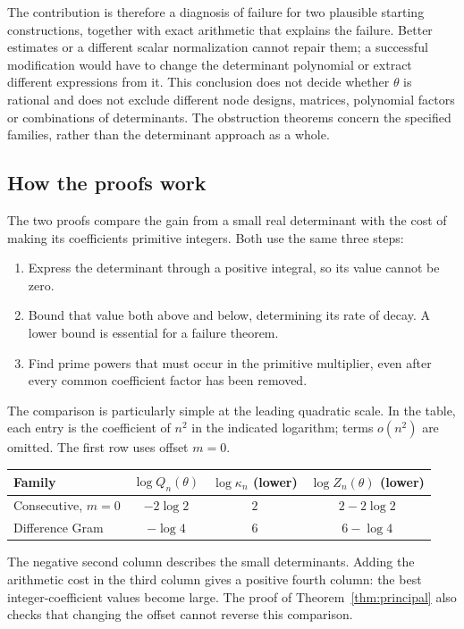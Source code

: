 \documentclass[11pt]{article}
\theoremstyle{definition}
\theoremstyle{remark}
\numberwithin{equation}{section}
\begin{document}
The contribution is therefore a diagnosis of failure for two plausible
starting constructions, together with exact arithmetic that explains
the failure. Better estimates or a different scalar normalization
cannot repair them; a successful modification would have to change the
determinant polynomial or extract different expressions from it.
This conclusion does not decide whether $\theta$ is rational and does
not exclude different node designs, matrices, polynomial factors or
combinations of determinants. The obstruction theorems concern the
specified families, rather than the determinant approach as a whole.

\subsection{How the proofs work}

The two proofs compare the gain from a small real determinant with
the cost of making its coefficients primitive integers. Both use
the same three steps:
\begin{enumerate}
\item Express the determinant through a positive integral, so its
      value cannot be zero.
\item Bound that value both above and below, determining its rate
      of decay. A lower bound is essential for a failure theorem.
\item Find prime powers that must occur in the primitive multiplier,
      even after every common coefficient factor has been removed.
\end{enumerate}

The comparison is particularly simple at the leading quadratic scale.
In the table, each entry is the coefficient of $n^2$ in the indicated
logarithm; terms $o(n^2)$ are omitted. The first row uses offset $m=0$.
\begin{center}
\begin{tabular}{lccc}
\toprule
Family & $\log Q_n(\theta)$ & $\log\kappa_n$ (lower)
       & $\log Z_n(\theta)$ (lower)\\
\midrule
Consecutive, $m=0$ & $-2\log2$ & $2$ & $2-2\log2$\\
Difference Gram & $-\log4$ & $6$ & $6-\log4$\\
\bottomrule
\end{tabular}
\end{center}
The negative second column describes the small determinants. Adding
the arithmetic cost in the third column gives a positive fourth
column: the best integer-coefficient values become large.
The proof of Theorem~\ref{thm:principal} also checks that changing
the offset cannot reverse this comparison.
\end{document}
